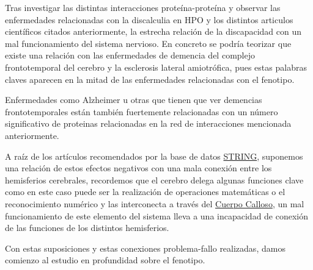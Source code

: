\hfill

Tras investigar las distintas interacciones proteína-proteína y observar las enfermedades relacionadas con la discalculia en HPO y los distintos articulos científicos citados anteriormente, la estrecha relación de la discapacidad con un mal funcionamiento del sistema nervioso. En concreto se podría teorizar que existe una relación con las enfermedades de demencia del complejo frontotemporal del cerebro y la esclerosis lateral amiotrófica, pues estas palabras claves aparecen en la mitad de las enfermedades relacionadas con el fenotipo.

\hfill

Enfermedades como Alzheimer u otras que tienen que ver demencias frontotemporales están también fuertemente relacionadas con un número significativo de proteinas relacionadas en la red de interacciones mencionada anteriormente.

\hfill

A raíz de los artículos recomendados por la base de datos \href{https://string-db.org/cgi/network?taskId=bhdt20FXsFkM&sessionId=bx1myVptKrEu}{STRING}, suponemos una relación de estos efectos negativos con una mala conexión entre los hemisferios cerebrales, recordemos que el cerebro delega algunas funciones clave como en este caso puede ser la realización de operaciones matemáticas o el reconocimiento numérico y las interconecta a través del \href{https://es.wikipedia.org/wiki/Cuerpo_calloso}{Cuerpo Calloso}, un mal funcionamiento de este elemento del sistema lleva a una incapacidad de conexión de las funciones de los distintos hemisferios.

\hfill


\hfill

Con estas suposiciones y estas conexiones problema-fallo realizadas, damos comienzo al estudio en profundidad sobre el fenotipo.


